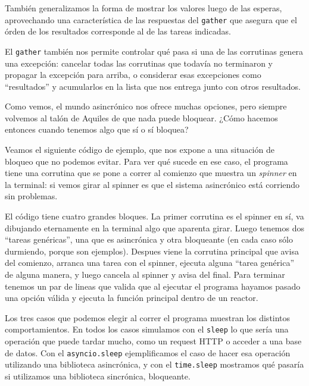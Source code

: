 También generalizamos la forma de mostrar los valores luego de las esperas, aprovechando una característica de las respuestas del \texttt{gather} que asegura que el órden de los resultados corresponde al de las tareas indicadas.


El \texttt{gather} también nos permite controlar qué pasa si una de las corrutinas genera una excepción: cancelar todas las corrutinas que todavía no terminaron y propagar la excepción para arriba, o considerar esas excepciones como ``resultados'' y acumularlos en la lista que nos entrega junto con otros resultados.

Como vemos, el mundo asincrónico nos ofrece muchas opciones, pero siempre volvemos al talón de Aquiles de que nada puede bloquear. ¿Cómo hacemos entonces cuando tenemos algo que sí o sí bloquea?

Veamos el siguiente código de ejemplo, que nos expone a una situación de bloqueo que no podemos evitar. Para ver qué sucede en ese caso, el programa tiene una corrutina que se pone a correr al comienzo que muestra un \textit{spinner} en la terminal: si vemos girar al spinner es que el sistema asincrónico está corriendo sin problemas.


El código tiene cuatro grandes bloques. La primer corrutina es el spinner en sí, va dibujando eternamente en la terminal algo que aparenta girar. Luego tenemos dos ``tareas genéricas'', una que es asincrónica y otra bloqueante (en cada caso sólo durmiendo, porque son ejemplos). Despues viene la corrutina principal que avisa del comienzo, arranca una tarea con el spinner, ejecuta alguna ``tarea genérica'' de alguna manera, y luego cancela al spinner y avisa del final. Para terminar tenemos un par de lineas que valida que al ejecutar el programa hayamos pasado una opción válida y ejecuta la función principal dentro de un reactor.

Los tres casos que podemos elegir al correr el programa muestran los distintos comportamientos. En todos los casos simulamos con el \texttt{sleep} lo que sería una operación que puede tardar mucho, como un request HTTP o acceder a una base de datos. Con el \texttt{asyncio.sleep} ejemplificamos el caso de hacer esa operación utilizando una biblioteca asincrónica, y con el \texttt{time.sleep} mostramos qué pasaría si utilizamos una biblioteca sincrónica, bloqueante.

